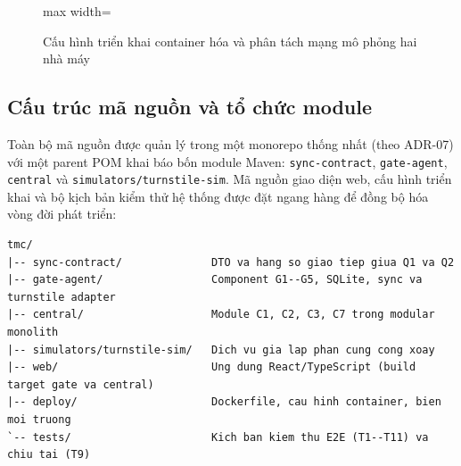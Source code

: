 \begin{figure}[H]
\begin{adjustbox}{max width=\textwidth}
\end{adjustbox}
\caption{Cấu hình triển khai container hóa và phân tách mạng mô phỏng hai nhà máy}
\label{fig:docker-topology}
\end{figure}

\subsection{Cấu trúc mã nguồn và tổ chức module}\label{sec:source-organization}

Toàn bộ mã nguồn được quản lý trong một monorepo thống nhất (theo ADR-07) với một parent POM khai
báo bốn module Maven: \texttt{sync-contract}, \texttt{gate-agent}, \texttt{central} và
\texttt{simulators/turnstile-sim}. Mã nguồn giao diện web, cấu hình triển khai và bộ kịch bản kiểm
thử hệ thống được đặt ngang hàng để đồng bộ hóa vòng đời phát triển:

\begin{verbatim}
tmc/
|-- sync-contract/              DTO va hang so giao tiep giua Q1 va Q2
|-- gate-agent/                 Component G1--G5, SQLite, sync va turnstile adapter
|-- central/                    Module C1, C2, C3, C7 trong modular monolith
|-- simulators/turnstile-sim/   Dich vu gia lap phan cung cong xoay
|-- web/                        Ung dung React/TypeScript (build target gate va central)
|-- deploy/                     Dockerfile, cau hinh container, bien moi truong
`-- tests/                      Kich ban kiem thu E2E (T1--T11) va chiu tai (T9)
\end{verbatim}

